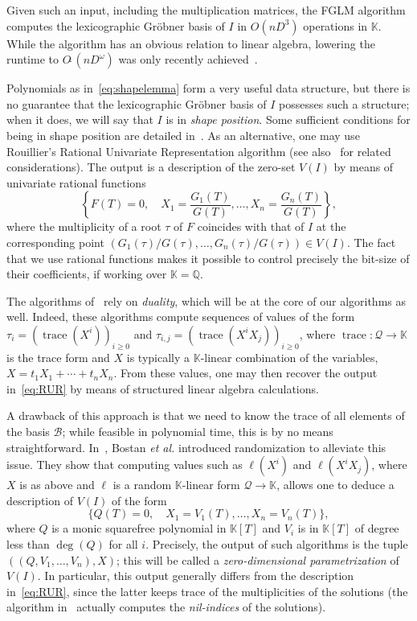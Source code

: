 \documentclass[12pt]{article}
\newcommand{\basis}{\mathscr{B}}
\newcommand{\trace}{\operatorname{trace}}
\newcommand{\lf}{X}
\newcommand{\residueI}{\mathscr{Q}}
\newcommand{\sqfree}{Q}
\def\Q {\ensuremath{\mathbb{Q}}}
\def\K{\mathbb{K}}
\def\K {\ensuremath{\mathbb{K}}}
\begin{document}
Given such an input, including the multiplication matrices, the FGLM
algorithm~\cite{FaGiLaMo93} computes the lexicographic Gr\"obner basis
of $I$ in $O(nD^3)$ operations in $\K$.  While the algorithm has an
obvious relation to linear algebra, lowering the runtime to
$O\tilde{~}(nD^\omega)$ was only recently
achieved~\cite{FaGaHuRe13,FaGaHuRe14,Neiger16}.

Polynomials as in~\cref{eq:shapelemma} form a very useful data
structure, but there is no guarantee that the lexicographic Gr\"obner
basis of $I$ possesses such a structure; when it does, we will say
that $I$ is in {\em shape position}. Some sufficient conditions for being in
shape position are detailed in~\cite{BeMoMaTr94}. 
As an alternative, one may use Rouillier's
Rational Univariate Representation algorithm \cite{Rouillier99} (see
also~\cite{AlBeRoWo94,BeWo96} for related considerations). The output
is a description of the zero-set $V(I)$ by means of univariate rational
functions
\begin{equation}\label{eq:RUR}
 \left\{  F(T)=0, \quad X_1 = \frac{G_1(T)}{G(T)}, \dots,X_n = \frac{G_n(T)}{G(T)} \right\},
\end{equation}
where the multiplicity of a root $\tau$ of $F$ coincides with that of
$I$ at the corresponding point
$(G_1(\tau)/G(\tau),\dots,G_n(\tau)/G(\tau)) \in V(I)$. The fact that
we use rational functions makes it possible to control
precisely the bit-size of their coefficients, if working over $\K=\Q$.

The algorithms of~\cite{AlBeRoWo94, BeWo96, Rouillier99} rely on
\emph{duality}, which will be at the core of our algorithms as well.
Indeed, these algorithms compute sequences of values of the form
$\tau_i=(\trace(\lf^i))_{i \ge 0}$ and 
$\tau_{i,j}=(\trace(\lf^i X_j))_{i \ge 0}$, where $\trace: \residueI \to \K$ is the trace 
form and $\lf$ is typically a $\K$-linear combination of the variables,
$\lf=t_1 X_1 + \cdots + t_n X_n$.
From these values, one may then recover the output in~\cref{eq:RUR} by means
of structured linear algebra calculations.

A drawback of this approach is that we need to know the trace of all
elements of the basis $\basis$; while feasible in polynomial time,
this is by no means straightforward. In~\cite{BoSaSc03}, Bostan {\it
  et al.} introduced randomization to alleviate this issue. They show
that computing values such as $\ell(\lf^i)$ and $\ell(\lf^i X_j)$, where
$\lf$ is as above and 
$\ell$ is a random $\K$-linear form $\residueI \to \K$, allows one to deduce
a description of $V(I)$ of the form
\begin{equation}\label{eq:BoSaSc03}
 \{  \sqfree(T)=0, \quad X_1 = V_1(T), \dots,X_n = V_n(T) \},
\end{equation}
where $\sqfree$ is a monic squarefree polynomial in $\K[T]$ and $V_i$ is in
$\K[T]$ of degree less than $\deg(\sqfree)$ for all $i$. Precisely, the
output of such algorithms is the tuple $((\sqfree,V_1,\dots,V_n),\lf)$; this
will be called a {\em zero-dimensional parametrization} of $V(I)$. In
particular, this output generally differs from the description
in~\cref{eq:RUR}, since the latter keeps trace of the multiplicities
of the solutions (the algorithm in~\cite{BoSaSc03} actually computes
the {\em nil-indices} of the solutions).
\end{document}
